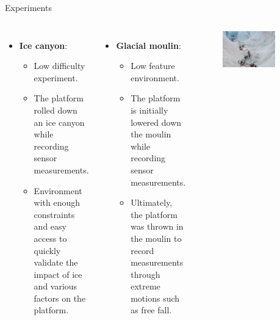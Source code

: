 \documentclass[final,hyperref={pdfpagelabels=false}]{beamer}
\begin{document}
\begin{frame}[t]
\begin{columns}[t]
\begin{column}{.02\textwidth}\end{column} %
\begin{column}{.970\textwidth}
\begin{block}{Experiments}
	\begin{columns} %
		\begin{minipage}{.33\textwidth} %
			\begin{itemize}
				\item \textbf{Ice canyon}: 
				\begin{itemize}
					\item Low difficulty experiment.
					\item The platform rolled down an ice canyon while recording sensor measurements.
					\item Environment with enough constraints and easy access to quickly validate the impact of ice and various factors on the platform.
				\end{itemize}
			\end{itemize}
			\begin{itemize}
				\item \textbf{Glacial moulin}: 
				\begin{itemize}
					\item Low feature environment.
					\item The platform is initially lowered down the moulin while recording sensor measurements.
					\item Ultimately, the platform was thrown in the moulin to record measurements through extreme motions such as free fall.
				\end{itemize}
			\end{itemize}
		\end{minipage}
		\begin{minipage}{.33\textwidth}
			\centering
			\begin{figure}
				\includegraphics[height=.65\linewidth]{figures/ice_canyon.jpeg}

\end{figure}
\end{minipage}
\end{columns}
\end{block}
\end{column}
\end{columns}
\end{frame}
\end{document}
